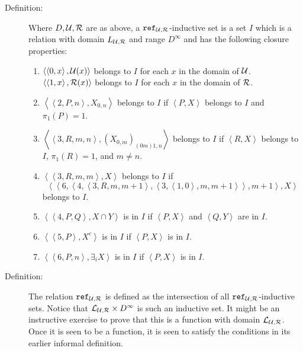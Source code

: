 \documentclass[12pt]{book}
\begin{document}
\begin{description}
\item[Definition:]  Where $D, \cal U, R$ are as above, a ${\tt ref}_{\cal U, R}$-inductive set is a set $I$ which is a relation with domain $L_{\cal U,R}$ and range $D^{\infty}$ and has the following closure properties:

\begin{enumerate}

\item $\left<\left<0,x\right>,{\cal U}(x)\right>$ belongs to $I$ for each $x$ in the domain of $\cal U$.   $\left<\left<1,x\right>,{\cal R}(x)\right>$ belongs to $I$ for
each $x$ in the domain of $\cal R$.

\item  $\left<\left<2,P,n\right>,X_{0,n}\right>$ belongs to $I$ if $\left<P,X\right>$ belongs to $I$ and $\pi_1(P)=1$.

\item $\left<\left<3,R,m,n\right>,(X_{0,m})_{(0m)1,n}\right>$ belongs to $I$ if $\left<R,X\right>$ belongs to $I$, $\pi_1(R)=1$, and $m\neq n$.

\item $\left<\left<3,R,m,m\right>,X\right>$ belongs to $I$ if $$\left<\left<6,\left<4,\left<3,R,m,m+1\right>,\left<3,\left<1,0\right>,m,m+1\right>\right>,m+1\right>,X\right>$$ belongs to $I$.

\item $\left<\left<4,P,Q\right>,X \cap Y\right>$ is in $I$ if $\left<P,X\right>$ and $\left<Q,Y\right>$ are in $I$.

\item $\left<\left<5,P\right>,X^c\right>$ is in $I$ if $\left<P,X\right>$ is in $I$.

\item $\left<\left<6,P,n\right>,\exists_iX\right>$ is in $I$ if $\left<P,X\right>$ is in $I$.

\end{enumerate}

\item[Definition:]  The relation ${\tt ref}_{\cal U,R}$ is defined as the intersection of all ${\tt ref}_{\cal U,R}$-inductive sets.  Notice that ${\cal L}_{\cal U,R} \times D^{\infty}$ is such an inductive set.  It might be an instructive exercise to prove that this is a function with domain ${\cal L}_{\cal U,R}$.   Once it is seen to be a function, it is seen to satisfy the conditions in its earlier informal definition.

\end{description}
\end{document}
